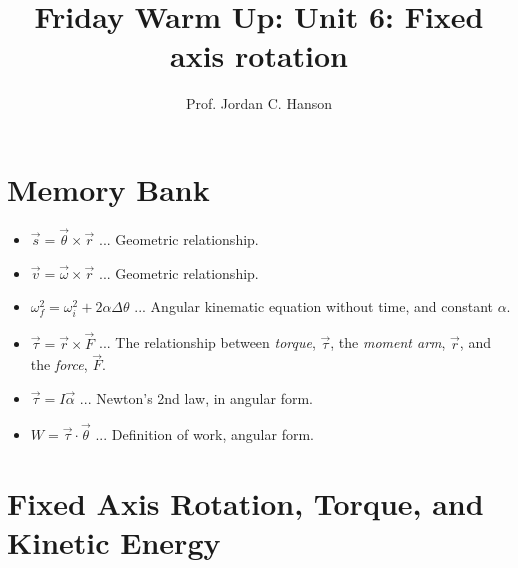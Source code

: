 \documentclass{article}
\begin{document}
\twocolumn

\title{Friday Warm Up: Unit 6: Fixed axis rotation}
\author{Prof. Jordan C. Hanson}

\maketitle

\section{Memory Bank}

\begin{itemize}
\item $\vec{s} = \vec{\theta} \times \vec{r}$ ... Geometric relationship.
\item $\vec{v} = \vec{\omega} \times \vec{r}$ ... Geometric relationship.
\item $\omega_f^2 = \omega_i^2 + 2\alpha\Delta\theta$ ... Angular kinematic equation without time, and constant $\alpha$.
\item $\vec{\tau} = \vec{r} \times \vec{F}$ ... The relationship between \textit{torque}, $\vec{\tau}$, the \textit{moment arm}, $\vec{r}$, and the \textit{force}, $\vec{F}$.
\item $\vec{\tau} = I \vec{\alpha}$ ... Newton's 2nd law, in angular form.
\item $W = \vec{\tau} \cdot \vec{\theta}$ ... Definition of work, angular form.
\end{itemize}

\section{Fixed Axis Rotation, Torque, and Kinetic Energy}
\end{document}
